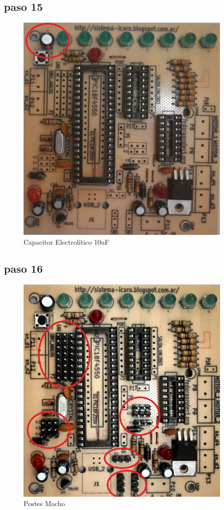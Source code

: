 \documentclass[letterpaper,10pt,english]{sphinxmanual}
\begin{document}
\subsection{paso 15}
\label{np07:paso-15}\begin{figure}[htbp]
\centering
\capstart

\includegraphics[width=300pt]{15b.jpg}
\caption{Capacitor Electrolítico 10uF}\end{figure}
\newpage

\subsection{paso 16}
\label{np07:paso-16}\begin{figure}[htbp]
\centering
\capstart

\includegraphics[width=300pt]{16b.jpg}
\caption{Postes Macho}\end{figure}
\newpage
\end{document}
